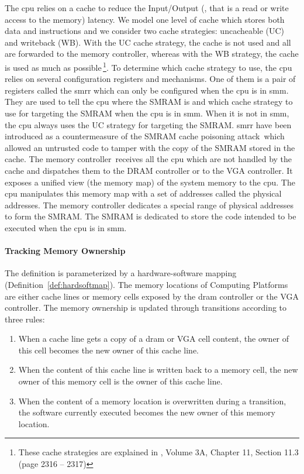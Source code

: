 The \ac{cpu} relies on a cache to reduce the Input/Output (\IO, that is a read
or write access to the memory) latency.
%
We model one level of cache which stores both data and instructions and we
consider two cache strategies: uncacheable (UC) and writeback (WB).
%
With the UC cache strategy, the cache is not used and all \IOs are forwarded to
the memory controller, whereas with the WB strategy, the cache is used as much
as possible\,\footnote{These cache strategies are explained in
  \cite{intel2014manual}, Volume 3A, Chapter 11, Section 11.3 (page 2316 --
  2317)}.
%
To determine which cache strategy to use, the \ac{cpu} relies on several
configuration registers and mechanisms.
%
One of them is a pair of registers called the \ac{smrr} which can only be
configured when the \ac{cpu} is in \ac{smm}.
%
They are used to tell the \ac{cpu} where the SMRAM is and which cache strategy
to use for \IO targeting the SMRAM when the \ac{cpu} is in \ac{smm}.  When it is
not in \ac{smm}, the \ac{cpu} always uses the UC strategy for \IO targeting the
SMRAM.
%
\ac{smrr} have been introduced as a countermeasure of the SMRAM cache poisoning
attack\,\cite{wojtczuk2009smram,duflot2009smram} which allowed an untrusted code
to tamper with the copy of the SMRAM stored in the cache.
%
The memory controller\,\cite{intel2009mch} receives all the \ac{cpu} \IOs which
are not handled by the cache and dispatches them to the DRAM controller or to
the VGA controller. It exposes a unified view (the memory map) of the system
memory to the \ac{cpu}.
%
The \ac{cpu} manipulates this memory map with a set of addresses called the
physical addresses.
%
The memory controller dedicates a special range of physical addresses to form
the SMRAM.
%
The SMRAM is dedicated to store the code intended to be executed when the
\ac{cpu} is in \ac{smm}.

\paragraph{Tracking Memory Ownership}
%
The  definition is parameterized by a hardware-software
mapping  (Definition~\ref{def:hardsoftmap}).
%
The memory locations of  Computing Platforms are either cache
lines or memory cells exposed by the \ac{dram} controller or the VGA controller.
%
The memory ownership is updated through transitions according to three rules:
%
\begin{enumerate}
\item When a cache line gets a copy of a \ac{dram} or VGA cell content, the
  owner of this cell becomes the new owner of this cache line.
%
\item When the content of this cache line is written back to a memory cell, the
  new owner of this memory cell is the owner of this cache line.
%
\item When the content of a memory location is overwritten during a transition,
  the software currently executed becomes the new owner of this memory location.
%
\end{enumerate}

